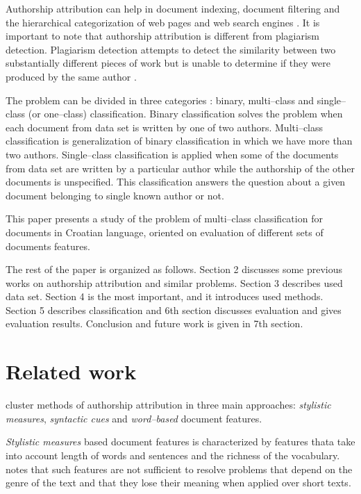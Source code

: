 \documentclass[11pt,english]{article}
\begin{document}
\begin{multicols}{2}
Authorship attribution can help in document indexing, document filtering and the
hierarchical categorization of web pages and web search engines
\citep{luyckx2005shallow}. It is important to note that authorship attribution
is different from plagiarism detection. Plagiarism detection attempts to detect the
similarity between two substantially different pieces of work but is unable to
determine if they were produced by the same author \citep{de2001mining}.

The problem can be divided in three categories \citep{zhao2005effective}: binary,
multi--class and single--class (or one--class) classification. Binary
classification solves the problem when each document from data set is written by
one of two authors. Multi--class classification is generalization of binary
classification in which we have more than two authors. Single--class
classification is applied when some of the documents from data set are written by
a particular author while the authorship of the other documents is unspecified.
This classification answers the question about a given document belonging to
single known author or not.

This paper presents a study of the problem of multi--class classification for
documents in Croatian language, oriented on evaluation of different sets of
documents features.

The rest of the paper is organized as follows. Section 2 discusses some previous
works on authorship attribution and similar problems. Section 3 describes used
data set. Section 4 is the most important, and it introduces used methods.
Section 5 describes classification and 6th section discusses evaluation and
gives evaluation results. Conclusion and future work is given in 7th section.

\section{Related work}
\citet{coyotl2006authorship} cluster methods of authorship attribution in three
main approaches: \emph{stylistic measures}, \emph{syntactic cues} and
\emph{word--based} document features.

\emph{Stylistic measures} based document features is characterized by features
thata take into account length of words and sentences and the
richness of the vocabulary. \citet{coyotl2006authorship} notes that such features are not
sufficient to resolve problems that depend on the genre of the text and that they
lose their meaning when applied over short texts.


\end{multicols}
\end{document}
